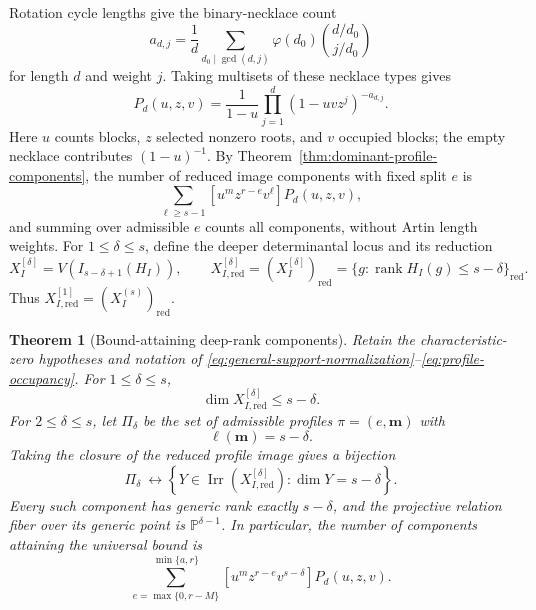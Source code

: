 \documentclass[10pt,fleqn]{article}
\numberwithin{equation}{section}
\newtheorem{theorem}{Theorem}[section]
\newcommand{\PP}{\mathbb P}
\newcommand{\rank}{\operatorname{rank}}
\newcommand{\Irr}{\operatorname{Irr}}
\begin{document}
Rotation cycle lengths give the binary-necklace count
\begin{equation}\label{eq:necklace-number}
 a_{d,j}=\frac1d\sum_{d_0\mid\gcd(d,j)}\varphi(d_0)
          \binom{d/d_0}{j/d_0}
\end{equation}
for length $d$ and weight $j$.  Taking multisets of these necklace types gives
\begin{equation}\label{eq:profile-generating-function}
 P_d(u,z,v)=\frac1{1-u}\prod_{j=1}^d(1-uvz^j)^{-a_{d,j}}.
\end{equation}
Here $u$ counts blocks, $z$ selected nonzero roots, and $v$ occupied
blocks; the empty necklace contributes $(1-u)^{-1}$.
By Theorem~\ref{thm:dominant-profile-components}, the number of reduced
image components with fixed split $e$ is
\begin{equation}\label{eq:component-count}
 \sum_{\ell\ge s-1}[u^mz^{r-e}v^\ell]P_d(u,z,v),
\end{equation}
and summing over admissible $e$ counts all components, without Artin
length weights.  For $1\le\delta\le s$, define the deeper determinantal
locus and its reduction
\begin{equation}\label{eq:deep-rank-locus}
 X_I^{[\delta]}=V(I_{s-\delta+1}(H_I)),\qquad
 X_{I,\mathrm{red}}^{[\delta]}=(X_I^{[\delta]})_{\mathrm{red}}
 =\{g:\rank H_I(g)\le s-\delta\}_{\mathrm{red}}.
\end{equation}
Thus $X_{I,\mathrm{red}}^{[1]}=(X_I^{(s)})_{\mathrm{red}}$.

\begin{theorem}[Bound-attaining deep-rank components]
\label{thm:deep-rank-profile-components}
Retain the characteristic-zero hypotheses and notation of
\eqref{eq:general-support-normalization}--\eqref{eq:profile-occupancy}.
For $1\le\delta\le s$,
\begin{equation}\label{eq:deep-rank-dimension-bound}
 \dim X_{I,\mathrm{red}}^{[\delta]}\le s-\delta.
\end{equation}
For $2\le\delta\le s$, let $\Pi_\delta$ be the set of admissible profiles
$\pi=(e,\boldsymbol m)$ with
\begin{equation}\label{eq:deep-profile-occupancy}
 \ell(\boldsymbol m)=s-\delta.
\end{equation}
Taking the closure of the reduced profile image gives a bijection
\begin{equation}\label{eq:deep-profile-bijection}
 \Pi_\delta\ \longleftrightarrow
 \left\{Y\in\Irr(X_{I,\mathrm{red}}^{[\delta]}):
                 \dim Y=s-\delta\right\}.
\end{equation}
Every such component has generic rank exactly $s-\delta$, and the projective relation fiber
over its generic point is $\PP^{\delta-1}$.  In particular, the number of components attaining
the universal bound is
\begin{equation}\label{eq:deep-component-count}
 \sum_{e=\max\{0,r-M\}}^{\min\{a,r\}}
 [u^mz^{r-e}v^{s-\delta}]P_d(u,z,v).
\end{equation}
\end{theorem}
\end{document}
